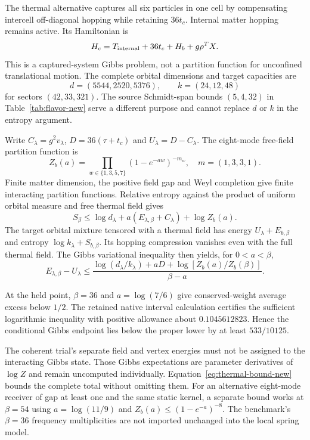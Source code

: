 The thermal alternative captures all six particles in one cell by
compensating intercell off-diagonal hopping while retaining $36t_c$.
Internal matter hopping remains active. Its Hamiltonian is
\begin{equation}
H_c=T_{\rm internal}+36t_c+H_b+g\rho^TX.
\end{equation}
This is a captured-system Gibbs problem, not a partition function for
unconfined translational motion. The complete orbital dimensions and
target capacities are
\begin{equation}
d=(5544,2520,5376),\qquad k=(24,12,48)
\end{equation}
for sectors $(42,33,321)$. The source Schmidt-span bounds $(5,4,32)$ in
Table~\ref{tab:flavor-new} serve a different purpose and cannot replace
$d$ or $k$ in the entropy argument.

Write $C_\lambda=g^2v_\lambda$, $D=36(\tau+t_c)$ and
$U_\lambda=D-C_\lambda$. The eight-mode free-field partition function is
\begin{equation}
Z_b(a)=\prod_{w\in\{1,3,5,7\}}(1-e^{-aw})^{-m_w},
\quad m=(1,3,3,1).
\end{equation}
Finite matter dimension, the positive field gap and Weyl completion give
finite interacting partition functions. Relative entropy against the
product of uniform orbital measure and free thermal field gives
\begin{equation}
S_\beta\leq\log d_\lambda+a(E_{\lambda,\beta}+C_\lambda)
+\log Z_b(a).
\end{equation}
The target orbital mixture tensored with a thermal field has energy
$U_\lambda+E_{b,\beta}$ and entropy
$\log k_\lambda+S_{b,\beta}$. Its hopping compression vanishes even with
the full thermal field. The Gibbs variational inequality then yields, for
$0<a<\beta$,
\begin{equation}
E_{\lambda,\beta}-U_\lambda
\leq\frac{\log(d_\lambda/k_\lambda)+aD+
\log[Z_b(a)/Z_b(\beta)]}{\beta-a}.
\label{eq:thermal-bound-new}
\end{equation}

At the held point, $\beta=36$ and $a=\log(7/6)$ give conserved-weight
average excess below $1/2$. The retained native interval calculation
certifies the sufficient logarithmic inequality with positive allowance
about $0.1045612823$. Hence the conditional Gibbs endpoint lies below the
proper lower by at least $533/10125$.

The coherent trial's separate field and vertex energies must not be
assigned to the interacting Gibbs state. Those Gibbs expectations are
parameter derivatives of $\log Z$ and remain uncomputed individually.
Equation~\eqref{eq:thermal-bound-new} bounds the complete total without
omitting them. For an alternative eight-mode receiver of gap at least one
and the same static kernel, a separate bound works at $\beta=54$ using
$a=\log(11/9)$ and $Z_b(a)\leq(1-e^{-a})^{-8}$. The benchmark's
$\beta=36$ frequency multiplicities are not imported unchanged into the
local spring model.

